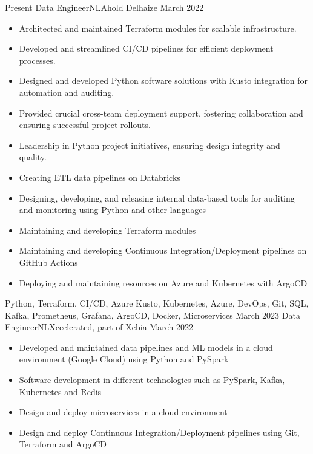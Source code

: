 \begin{experiences}
  \experience
  {Present}   {Data Engineer}{NL}{Ahold Delhaize}
  {March 2022} {
    \begin{itemize}
      \item Architected and maintained Terraform modules for scalable infrastructure.
      \item Developed and streamlined CI/CD pipelines for efficient deployment processes.
      \item Designed and developed Python software solutions with Kusto integration for automation and auditing.
      \item Provided crucial cross-team deployment support, fostering collaboration and ensuring successful project rollouts.
      \item Leadership in Python project initiatives, ensuring design integrity and quality.
      \item Creating ETL data pipelines on Databricks
      \item Designing, developing, and releasing internal data-based tools for auditing and monitoring using Python and other languages
      \item Maintaining and developing Terraform modules
      \item Maintaining and developing Continuous Integration/Deployment pipelines on GitHub Actions
      \item Deploying and maintaining resources on Azure and Kubernetes with ArgoCD
    \end{itemize}
  }
  {Python, Terraform, CI/CD, Azure Kusto, Kubernetes, Azure, DevOps, Git, SQL, Kafka, Prometheus, Grafana, ArgoCD, Docker, Microservices}
  \emptySeparator
  \experience
  {March 2023}   {Data Engineer}{NL}{Xccelerated, part of Xebia}
  {March 2022} {
    \begin{itemize}
      \item Developed and maintained data pipelines and ML models in a cloud environment (Google Cloud) using Python and PySpark
      \item Software development in different technologies such as PySpark, Kafka, Kubernetes and Redis
      \item Design and deploy microservices in a cloud environment
      \item Design and deploy Continuous Integration/Deployment pipelines using Git, Terraform and ArgoCD
    \end{itemize}
}
\end{experiences}
